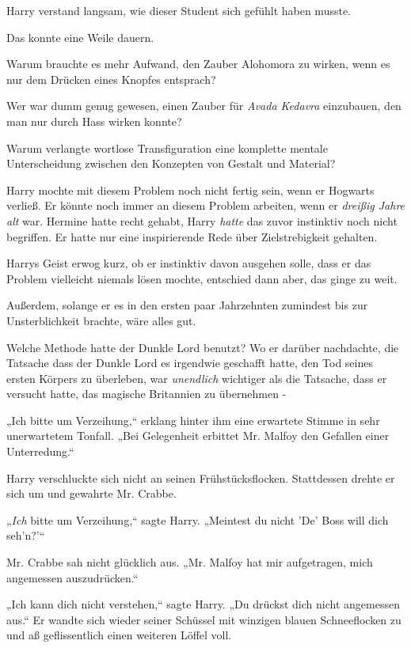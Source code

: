{Harry verstand langsam, wie dieser Student sich gefühlt haben musste.

Das konnte eine Weile dauern.

Warum brauchte es mehr Aufwand, den Zauber Alohomora zu wirken, wenn es nur dem Drücken eines Knopfes entsprach?

Wer war dumm genug gewesen, einen Zauber für \emph{Avada Kedavra} einzubauen, den man nur durch Hass wirken konnte?

Warum verlangte wortlose Transfiguration eine komplette mentale Unterscheidung zwischen den Konzepten von Gestalt und Material?

Harry mochte mit diesem Problem noch nicht fertig sein, wenn er Hogwarts verließ. Er könnte noch immer an diesem Problem arbeiten, wenn er \emph{dreißig Jahre alt} war. Hermine hatte recht gehabt, Harry \emph{hatte} das zuvor instinktiv noch nicht begriffen. Er hatte nur eine inspirierende Rede über Zielstrebigkeit gehalten.

Harrys Geist erwog kurz, ob er instinktiv davon ausgehen solle, dass er das Problem vielleicht niemals lösen mochte, entschied dann aber, das ginge zu weit.

Außerdem, solange er es in den ersten paar Jahrzehnten zumindest bis zur Unsterblichkeit brachte, wäre alles gut.

Welche Methode hatte der Dunkle Lord benutzt? Wo er darüber nachdachte, die Tatsache dass der Dunkle Lord es irgendwie geschafft hatte, den Tod seines ersten Körpers zu überleben, war \emph{unendlich} wichtiger als die Tatsache, dass er versucht hatte, das magische Britannien zu übernehmen -

„Ich bitte um Verzeihung,“ erklang hinter ihm eine erwartete Stimme in sehr unerwartetem Tonfall. „Bei Gelegenheit erbittet Mr. Malfoy den Gefallen einer Unterredung.“

Harry verschluckte sich nicht an seinen Frühstücksflocken. Stattdessen drehte er sich um und gewahrte Mr. Crabbe.

„\emph{Ich} bitte um Verzeihung,“ sagte Harry. „Meintest du nicht 'De' Boss will dich seh'n?'“

Mr. Crabbe sah nicht glücklich aus. „Mr. Malfoy hat mir aufgetragen, mich angemessen auszudrücken.“

„Ich kann dich nicht verstehen,“ sagte Harry. „Du drückst dich nicht angemessen aus.“ Er wandte sich wieder seiner Schüssel mit winzigen blauen Schneeflocken zu und aß geflissentlich einen weiteren Löffel voll.

}
